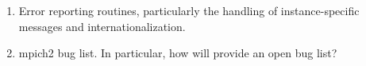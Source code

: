 \documentclass{article}
\begin{document}
\begin{enumerate}
  \begin{enumerate}
  \item Error reporting routines, particularly the handling of
    instance-specific messages and internationalization.
  \item mpich2 bug list.  In particular, how will provide an open bug list?
  \end{enumerate}
\end{enumerate}

\end{document}
